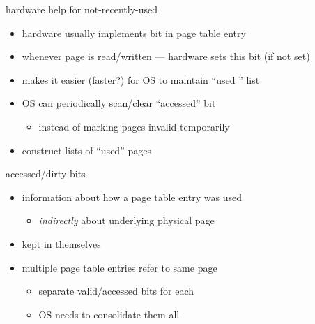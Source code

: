 \begin{frame}{hardware help for not-recently-used}
\begin{itemize}
\item hardware usually implements  bit in page table entry
\item whenever page is read/written --- hardware sets this bit (if not set)
\vspace{.5cm}
\item makes it easier (faster?) for OS to maintain ``used '' list
\item OS can periodically scan/clear ``accessed'' bit
    \begin{itemize}
    \item instead of marking pages invalid temporarily
    \end{itemize}
\item construct lists of ``used'' pages
\end{itemize}
\end{frame}

\begin{frame}{accessed/dirty bits}
\begin{itemize}
\item information about how a page table entry was used
    \begin{itemize}
    \item \textit{indirectly} about underlying physical page
    \end{itemize}
\item kept in  themselves
\vspace{.5cm}
\item<2-> multiple page table entries refer to same page
    \begin{itemize}
    \item separate valid/accessed bits for each
    \item OS needs to consolidate them all
    \end{itemize}
\end{itemize}
\end{frame}
